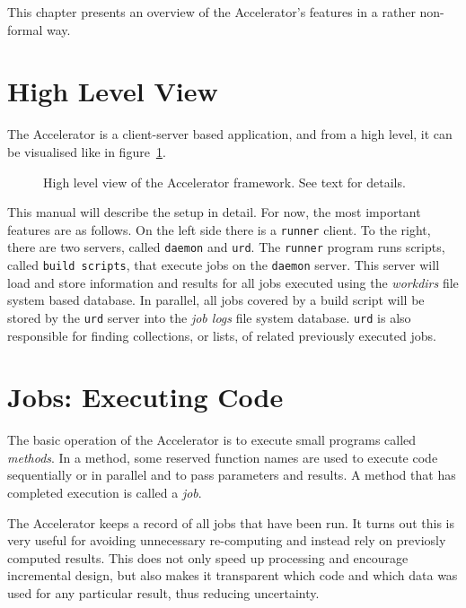 This chapter presents an overview of the Accelerator's features in a
rather non-formal way.

\section{High Level View}

The Accelerator is a client-server based application, and from a high
level, it can be visualised like in figure~\ref{fig:overview}.
\begin{figure}[h!]
  \begin{center}
    
    \caption{High level view of the Accelerator framework.  See text
      for details.}
    \label{fig:overview}
  \end{center}
\end{figure}
This manual will describe the setup in detail.  For now, the most
important features are as follows.  On the left side there is a
\texttt{runner} client.  To the right, there are two servers, called
\texttt{daemon} and \texttt{urd}.  The \texttt{runner} program runs
scripts, called \texttt{build scripts}, that execute jobs on the
\texttt{daemon} server.  This server will load and store information
and results for all jobs executed using the \textsl{workdirs} file
system based database.  In parallel, all jobs covered by a build
script will be stored by the \texttt{urd} server into the \textsl{job
  logs} file system database.  \texttt{urd} is also responsible for
finding collections, or lists, of related previously executed jobs.



\section{Jobs:  Executing Code}
The basic operation of the Accelerator is to execute small programs
called \textsl{methods}.  In a method, some reserved function names
are used to execute code sequentially or in parallel and to pass
parameters and results.  A method that has completed execution is
called a \textsl{job}.

The Accelerator keeps a record of all jobs that have been run.  It
turns out this is very useful for avoiding unnecessary re-computing
and instead rely on previosly computed results.  This does not only
speed up processing and encourage incremental design, but also makes
it transparent which code and which data was used for any particular
result, thus reducing uncertainty.

